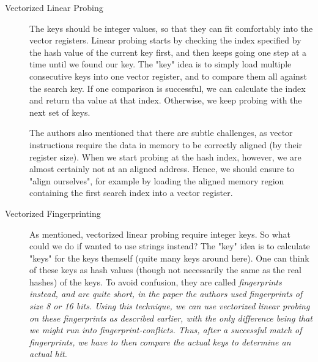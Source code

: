\documentclass[../../main.tex]{subfiles}
\begin{document}
\begin{description}
    \item[Vectorized Linear Probing] The keys should be integer values, so that they can fit comfortably into the vector registers. Linear probing starts by checking the index specified by the hash value of the current key first, and then keeps going one step at a time until we found our key. The "key" idea is to simply load multiple consecutive keys into one vector register, and to compare them all against the search key. If one comparison is successful, we can calculate the index and return tha value at that index. Otherwise, we keep probing with the next set of keys.
    
    The authors also mentioned that there are subtle challenges, as vector instructions require the data in memory to be correctly aligned (by their register size). When we start probing at the hash index, however, we are almost certainly not at an aligned address. Hence, we should ensure to "align ourselves", for example by loading the aligned memory region containing the first search index into a vector register.

    \item[Vectorized Fingerprinting] As mentioned, vectorized linear probing require integer keys. So what could we do if wanted to use strings instead? The "key" idea is to calculate "keys" for the keys themself (quite many keys around here). One can think of these keys as hash values (though not necessarily the same as the real hashes) of the keys. To avoid confusion, they are called \em fingerprints \em instead, and are quite short, in the paper the authors used fingerprints of size 8 or 16 bits. Using this technique, we can use vectorized linear probing on these fingerprints as described earlier, with the only difference being that we might run into fingerprint-conflicts. Thus, after a successful match of fingerprints, we have to then compare the actual keys to determine an actual hit.
\end{description}
\end{document}
